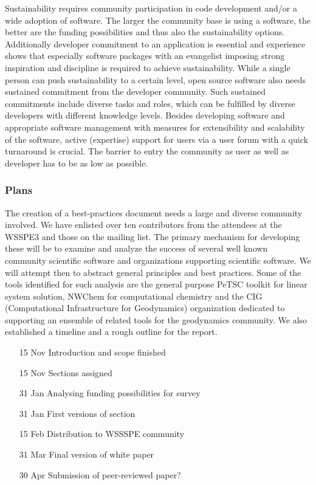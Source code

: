 Sustainability requires community participation in code development and/or a wide adoption of software. The larger the community base is using a software, the better are the funding possibilities and thus also the sustainability options. Additionally developer commitment to an application is essential and experience shows that especially software packages with an evangelist imposing strong inspiration and discipline is required to achieve sustainability.
While a single person can push sustainability to a certain level, open source software also needs sustained commitment from the developer community. Such sustained commitments include diverse tasks and roles, which can be fulfilled by diverse developers with different knowledge levels. Besides developing software and appropriate software management with measures for extensibility and scalability of the software, active (expertise) support for users via a user forum with a quick turnaround is crucial. The barrier to entry the community as user as well as developer has to be as low as possible.

\subsubsection{Plans}
The creation of a best-practices document needs a large and diverse community involved. We have enlisted over ten contributors from the attendees at the WSSPE3 and 
those on the mailing list. The primary mechanism for developing these will be to examine and analyze the success of several well known community scientific
software and organizations supporting scientific software. We will attempt then to abstract general principles and best practices. Some of the tools identified for such analysis are
the general purpose PeTSC toolkit for linear system solution, NWChem for computational chemistry and the CIG (Computational Infrastructure for Geodynamics) organization dedicated to supporting an ensemble of related tools for the geodynamics community. 
We also established a timeline and a rough outline for the report.

\begin{itemize}
%
\item [15 Nov] Introduction and scope finished
\item [15 Nov] Sections assigned
\item [31 Jan] Analysing funding possibilities for survey
\item [31 Jan] First versions of section
\item [15 Feb] Distribution to WSSSPE community
\item [31 Mar] Final version of white paper
\item [30 Apr] Submission of peer-reviewed paper?
\end{itemize}


